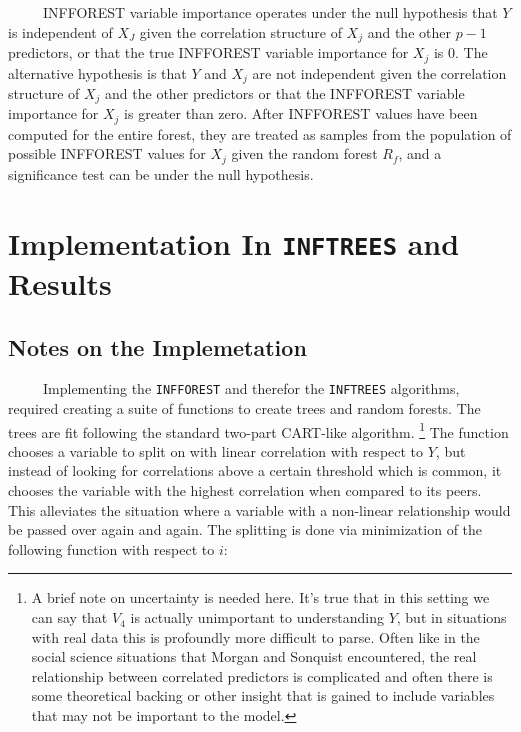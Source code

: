 \documentclass[12pt,twoside]{reedthesis}
\begin{document}
  ~~~~~INFFOREST variable importance operates under the null hypothesis
  that \(Y\) is independent of \(X_J\) given the correlation structure of
  \(X_j\) and the other \(p-1\) predictors, or that the true INFFOREST
  variable importance for \(X_j\) is 0. The alternative hypothesis is that
  \(Y\) and \(X_j\) are not independent given the correlation structure of
  \(X_j\) and the other predictors or that the INFFOREST variable
  importance for \(X_j\) is greater than zero. After INFFOREST values have
  been computed for the entire forest, they are treated as samples from
  the population of possible INFFOREST values for \(X_j\) given the random
  forest \(R_f\), and a significance test can be under the null
  hypothesis.
  
  \section{\texorpdfstring{Implementation In \texttt{INFTREES} and
  Results}{Implementation In INFTREES and Results}}\label{implementation-in-inftrees-and-results}
  
  \subsection{Notes on the
  Implemetation}\label{notes-on-the-implemetation}
  
  ~~~~~Implementing the \texttt{INFFOREST} and therefor the
  \texttt{INFTREES} algorithms, required creating a suite of functions to
  create trees and random forests. The trees are fit following the
  standard two-part CART-like algorithm. \footnote{A brief note on
    uncertainty is needed here. It's true that in this setting we can say
    that \(V_4\) is actually unimportant to understanding \(Y\), but in
    situations with real data this is profoundly more difficult to parse.
    Often like in the social science situations that Morgan and Sonquist
    encountered, the real relationship between correlated predictors is
    complicated and often there is some theoretical backing or other
    insight that is gained to include variables that may not be important
    to the model.} The function chooses a variable to split on with linear
  correlation with respect to \(Y\), but instead of looking for
  correlations above a certain threshold which is common, it chooses the
  variable with the highest correlation when compared to its peers. This
  alleviates the situation where a variable with a non-linear relationship
  would be passed over again and again. The splitting is done via
  minimization of the following function with respect to \(i\):
  
\end{document}
